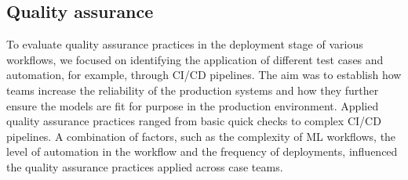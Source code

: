 


\subsection{Quality assurance}
To evaluate quality assurance practices %
in the deployment stage of various workflows, we focused on identifying the application of different test cases and automation, for example, through CI/CD pipelines. %
The aim was to establish how teams increase the reliability of the production systems and how they further ensure the models are fit for purpose in the production environment. Applied quality assurance practices ranged from basic quick checks to complex CI/CD pipelines. A combination of factors, such as the complexity of ML workflows, the level of automation in the workflow and the frequency of deployments, influenced 
the quality assurance practices applied across case teams.


